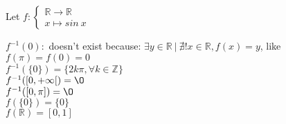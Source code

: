 \documentclass{article}
\begin{document}
\noindent Let
$
f:\begin{cases}
\mathbb{R} \rightarrow \mathbb{R}\\
x \mapsto sin\ x
\end{cases}
$

\noindent
$f^{-1}(0) : $ doesn't exist because:
$\exists y \in \mathbb{R} \ | \ 
\nexists! x \in \mathbb{R}, f(x) = y$, like $f(\pi) = f(0) = 0 $\\
$f^{-1}(\{0\}) = \{ 2k\pi, \forall k \in \mathbb{Z} \}$\\
$f^{-1}([0, +\infty[) = \O$\\
$f^{-1}([0, \pi]) = \O$\\
$f(\{0\}) = \{0\}$\\
$f(\mathbb{R}) = [0, 1]$
\end{document}
